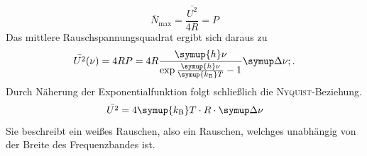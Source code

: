 %
\begin{equation}
  \bar{N}_\text{max}=\frac{\bar{U^2}}{4R}=P
\end{equation}
%
Das mittlere Rauschspannungsquadrat ergibt sich daraus zu
%
\begin{equation}
  \bar{U^2}(\nu)=4RP=4R\frac{\symup{h}\nu}{\exp{\frac{\symup{h}\nu}{\symup{k_\text{B}}T}}-1}\upD\nu\\; .
\end{equation}
%
Durch Näherung der Exponentialfunktion folgt schließlich die \textsc{Nyquist}-Beziehung.
%
\begin{equation}
  \bar{U^2}=4\symup{k_\text{B}}T\cdot R\cdot\upD\nu
\end{equation}
%
Sie beschreibt ein weißes Rauschen, also ein Rauschen, welchges unabhängig von der Breite des Frequenzbandes ist.
